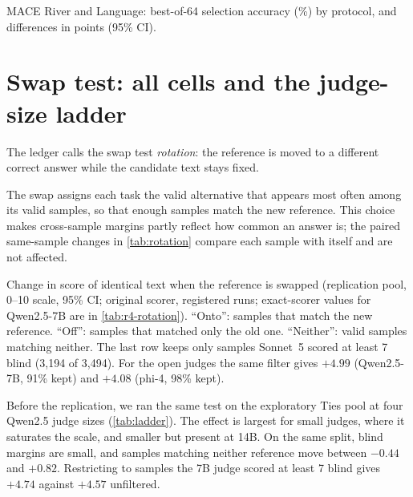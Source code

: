 \begin{table}[htbp]
\centering
\caption{\textsc{MACE} River and Language: best-of-64 selection accuracy (\%) by protocol, and differences in points (95\% CI).\pre}
\label{tab:mace-accuracy}
\footnotesize
\setlength{\tabcolsep}{3pt}
\begin{adjustbox}{max width=\linewidth}\end{adjustbox}

\end{table}

\FloatBarrier
\section{Swap test: all cells and the judge-size ladder}
\label{app:rotation}

The ledger calls the swap test \emph{rot\-ation}: the reference is moved to a different correct answer while the candidate text stays fixed.

The swap assigns each task the valid alternative that appears most often among its valid samples, so that enough samples match the new reference. This choice makes cross-sample margins partly reflect how common an answer is; the paired same-sample changes in \cref{tab:rotation} compare each sample with itself and are not affected.

\begin{table}[htbp]
\centering
\caption{Change in score of identical text when the reference is swapped (replication pool, 0--10 scale, 95\% CI; original scorer, registered runs; exact-scorer values for Qwen2.5-7B are in \cref{tab:r4-rotation}). ``Onto'': samples that match the new reference. ``Off'': samples that matched only the old one. ``Neither'': valid samples matching neither. The last row keeps only samples Sonnet~5 scored at least 7 blind (3,194 of 3,494). For the open judges the same filter gives $+4.99$  (Qwen2.5-7B, 91\% kept) and $+4.08$ (phi-4, 98\% kept).\pre}
\label{tab:rotation}
\footnotesize
\setlength{\tabcolsep}{3pt}
\begin{adjustbox}{max width=\linewidth}\end{adjustbox}

\end{table}

Before the replication, we ran the same test on the exploratory Ties pool at four Qwen2.5 judge sizes (\cref{tab:ladder}). The effect is largest for small judges, where it saturates the scale, and smaller but present at 14B. On the same split, blind margins are small, and samples matching neither reference move between $-0.44$ and $+0.82$. Restricting to samples the 7B judge scored at least 7 blind gives $+4.74$  against $+4.57$ unfiltered.

